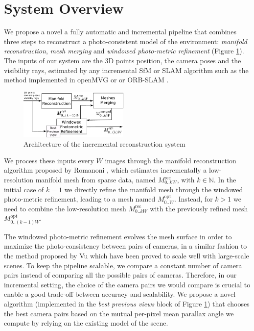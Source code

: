 \documentclass[times,10pt,twocolumn]{article}
\begin{document}
\section{System Overview}%
\label{sec:incremental_dense}
We propose a novel a fully automatic and incremental pipeline that combines three steps to reconstruct a photo-consistent model of the environment: \emph{manifold reconstruction}, \emph{mesh merging} and \emph{windowed photo-metric refinement} (Figure \ref{fig:architecture}). 
The inputs of our system are the 3D points position, the camera poses and the visibility rays, estimated by any incremental SfM or SLAM algorithm such as the method implemented in openMVG or \cite{moulon2012adaptive} or ORB-SLAM \cite{mur2015orb}. 
 
 \begin{figure}[t]
  \centering
  \includegraphics[width=0.48\textwidth]{pipeline}
  \caption{Architecture of the incremental reconstruction system}
  \label{fig:architecture}
\end{figure}

We process these inputs every $W$ images through the manifold reconstruction algorithm proposed by Romanoni \etal \cite{romanoni15b}, which estimates incrementally a low-resolution manifold mesh from sparse data, named  $\mathit{M}_{0..kW}^{\text{rec}}$, with $k \in \mathbb{N}$. 
In the initial case of $k=1$ we directly refine the manifold mesh through the windowed photo-metric refinement, leading to a mesh named $\mathit{M}_{0..W}^{\text{opt}}$.
Instead, for $k>1$ we need to combine the low-resolution mesh $\mathit{M}_{0..kW}^{\text{rec}}$ with the previously refined mesh $\mathit{M}_{0..(k-1)W}^{\text{opt}}$. 

The windowed photo-metric refinement evolves the mesh surface in order to maximize the photo-consistency between pairs of cameras, in a similar fashion to the method proposed by Vu \etal \cite{vu_et_al_2012} which have been proved to scale well with large-scale scenes.
To keep the pipeline scalable, we compare a constant number of camera pairs instead of comparing all the possible pairs of cameras. 
Therefore, in our incremental setting, the choice of the camera pairs we would compare is crucial to enable a good trade-off between  accuracy and scalability.
We propose a novel algorithm (implemented in the \emph{best previous views} block of Figure \ref{fig:architecture}) that chooses the best camera pairs based on the mutual per-pixel mean parallax angle we compute by relying on the existing model of the scene.
\end{document}
